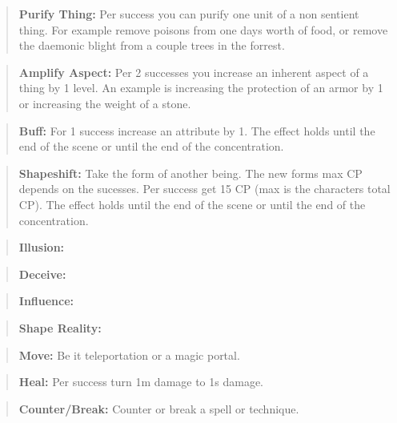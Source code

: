 \documentclass[11pt]{article}
\begin{document}
{\begin{multicols}{2}[]
\begin{quote}
\textbf{Purify Thing:} Per success you can purify one unit of a non sentient thing. For example remove poisons from one days worth of food, or remove the daemonic blight from a couple trees in the forrest.
\end{quote}

\begin{quote}
\textbf{Amplify Aspect:} Per 2 successes you increase an inherent aspect of a thing by 1 level. An example is increasing the protection of an armor by 1 or increasing the weight of a stone.
\end{quote}

\begin{quote}
\textbf{Buff:} For 1 success increase an attribute by 1. The effect holds until the end of the scene or until the end of the concentration.
\end{quote}

\begin{quote}
\textbf{Shapeshift:} Take the form of another being. The new forms max CP depends on the sucesses. Per success get 15 CP (max is the characters total CP). The effect holds until the end of the scene or until the end of the concentration.
\end{quote}

\begin{quote}
\textbf{Illusion:}
\end{quote}

\begin{quote}
\textbf{Deceive:} 
\end{quote}

\begin{quote}
\textbf{Influence:} 
\end{quote}

\begin{quote}
\textbf{Shape Reality:} 
\end{quote}

\begin{quote}
\textbf{Move:} Be it teleportation or a magic portal. 
\end{quote}

\begin{quote}
\textbf{Heal:} Per success turn 1m damage to 1s damage.
\end{quote}

\begin{quote}
\textbf{Counter/Break:} Counter or break a spell or technique.
\end{quote}


\end{multicols}}
\end{document}
